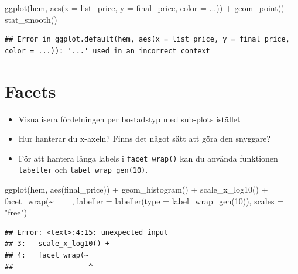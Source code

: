 \documentclass[
]{book}
\newenvironment{Shaded}{\begin{snugshade}}{\end{snugshade}}
\newcommand{\AttributeTok}[1]{\textcolor[rgb]{0.77,0.63,0.00}{#1}}
\newcommand{\DecValTok}[1]{\textcolor[rgb]{0.00,0.00,0.81}{#1}}
\newcommand{\FunctionTok}[1]{\textcolor[rgb]{0.00,0.00,0.00}{#1}}
\newcommand{\NormalTok}[1]{#1}
\newcommand{\SpecialCharTok}[1]{\textcolor[rgb]{0.00,0.00,0.00}{#1}}
\newcommand{\StringTok}[1]{\textcolor[rgb]{0.31,0.60,0.02}{#1}}
\providecommand{\tightlist}{%
  \setlength{\itemsep}{0pt}\setlength{\parskip}{0pt}}
\begin{document}
\begin{Shaded}
\begin{Highlighting}[]
\FunctionTok{ggplot}\NormalTok{(hem, }\FunctionTok{aes}\NormalTok{(}\AttributeTok{x =}\NormalTok{ list\_price, }
                \AttributeTok{y =}\NormalTok{ final\_price,}
                \AttributeTok{color =}\NormalTok{ ...)) }\SpecialCharTok{+}
  \FunctionTok{geom\_point}\NormalTok{() }\SpecialCharTok{+}
  \FunctionTok{stat\_smooth}\NormalTok{()}
\end{Highlighting}
\end{Shaded}

\begin{verbatim}
## Error in ggplot.default(hem, aes(x = list_price, y = final_price, color = ...)): '...' used in an incorrect context
\end{verbatim}

\hypertarget{facets-1}{%
\section{Facets}\label{facets-1}}

\begin{itemize}
\tightlist
\item
  Visualisera fördelningen per bostadstyp med sub-plots istället
\item
  Hur hanterar du x-axeln? Finns det något sätt att göra den snyggare?
\item
  För att hantera långa labels i \texttt{facet\_wrap()} kan du använda funktionen \texttt{labeller} och \texttt{label\_wrap\_gen(10)}.
\end{itemize}

\begin{Shaded}
\begin{Highlighting}[]
\FunctionTok{ggplot}\NormalTok{(hem, }\FunctionTok{aes}\NormalTok{(final\_price)) }\SpecialCharTok{+}
  \FunctionTok{geom\_histogram}\NormalTok{() }\SpecialCharTok{+}
  \FunctionTok{scale\_x\_log10}\NormalTok{() }\SpecialCharTok{+}
  \FunctionTok{facet\_wrap}\NormalTok{(}\SpecialCharTok{\textasciitilde{}}\NormalTok{\_\_\_, }\AttributeTok{labeller =} \FunctionTok{labeller}\NormalTok{(}\AttributeTok{type =} \FunctionTok{label\_wrap\_gen}\NormalTok{(}\DecValTok{10}\NormalTok{)), }\AttributeTok{scales =} \StringTok{"free"}\NormalTok{)}
\end{Highlighting}
\end{Shaded}

\begin{verbatim}
## Error: <text>:4:15: unexpected input
## 3:   scale_x_log10() +
## 4:   facet_wrap(~_
##                  ^
\end{verbatim}
\end{document}
